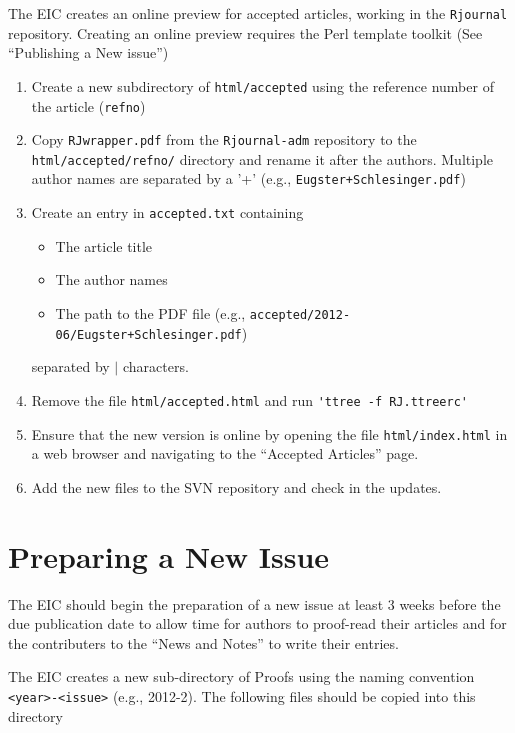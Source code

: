 \documentclass[11pt]{article}
\begin{document}
The EIC creates an online preview for accepted articles, working
in the \texttt{Rjournal} repository. Creating an online preview
requires the Perl template toolkit (See ``Publishing a New issue'')

\begin{enumerate}
\item Create a new subdirectory of \verb+html/accepted+ using the
  reference number of the article (\verb+refno+)
\item Copy \texttt{RJwrapper.pdf} from the \texttt{Rjournal-adm}
  repository to the \verb+html/accepted/refno/+ directory and rename
  it after the authors. Multiple author names are separated by a '+'
  (e.g., \texttt{Eugster+Schlesinger.pdf})
\item Create an entry in \texttt{accepted.txt} containing 
  \begin{itemize}
  \item The article title
  \item The author names
  \item The path to the PDF file (e.g.,
    \texttt{accepted/2012-06/Eugster+Schlesinger.pdf})
  \end{itemize}
  separated by $|$ characters.
\item Remove the file \verb+html/accepted.html+ and run
  \verb+'ttree -f RJ.ttreerc'+
\item Ensure that the new version is online by opening the file 
\verb+html/index.html+ in a web browser and navigating to the
``Accepted Articles'' page.
\item Add the new files to the SVN repository and check in the updates.
\end{enumerate}

\section{Preparing a New Issue}

The EIC should begin the preparation of a new issue at least 3 weeks
before the due publication date to allow time for authors to proof-read
their articles and for the contributers to the ``News and Notes'' to
write their entries.

The EIC creates a new sub-directory of Proofs using the naming
convention \verb+<year>-<issue>+ (e.g., 2012-2). The following files
should be copied into this directory
\end{document}
